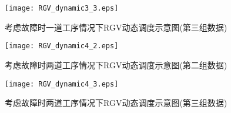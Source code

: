 \documentclass[no-math,withoutpreface,bwprint]{cumcmthesis} %
\numberwithin{equation}{section}
\numberwithin{figure}{section}
\numberwithin{table}{section}
\begin{document}
\begin{figure}[H]
	\hspace{-0.5cm}
	\texttt{[image: RGV\_dynamic3\_3.eps]}
	\caption{考虑故障时一道工序情况下RGV动态调度示意图(第三组数据)}
\end{figure}

\begin{figure}[H]
	\hspace{-0.5cm}
	\texttt{[image: RGV\_dynamic4\_2.eps]}
	\caption{考虑故障时两道工序情况下RGV动态调度示意图(第二组数据)}
\end{figure}

\begin{figure}[H]
	\hspace{-0.5cm}
	\texttt{[image: RGV\_dynamic4\_3.eps]}
	\caption{考虑故障时两道工序情况下RGV动态调度示意图(第三组数据)}
\end{figure}

\newpage
\end{document}
